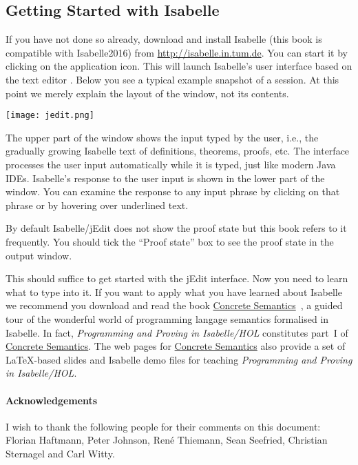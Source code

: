 \ifsem
\subsection*{Getting Started with Isabelle}

If you have not done so already, download and install Isabelle
(this book is compatible with Isabelle2016)
from \url{http://isabelle.in.tum.de}. You can start it by clicking
on the application icon. This will launch Isabelle's
user interface based on the text editor . Below you see
a typical example snapshot of a session. At this point we merely explain
the layout of the window, not its contents.

\begin{center}
\texttt{[image: jedit.png]}
\end{center}
The upper part of the window shows the input typed by the user, i.e., the
gradually growing Isabelle text of definitions, theorems, proofs, etc.  The
interface processes the user input automatically while it is typed, just like
modern Java IDEs.  Isabelle's response to the user input is shown in the
lower part of the window. You can examine the response to any input phrase
by clicking on that phrase or by hovering over underlined text.

\begin{warn}\label{proof-state}
By default Isabelle/jEdit does not show the proof state but this book
refers to it frequently. You should tick the ``Proof state'' box
to see the proof state in the output window.
\end{warn}

This should suffice to get started with the jEdit interface.
Now you need to learn what to type into it.
\else
If you want to apply what you have learned about Isabelle we recommend you
download and read the book
\href{http://www.concrete-semantics.org}{Concrete
Semantics}~\cite{ConcreteSemantics}, a guided tour of the wonderful world of
programming langage semantics formalised in Isabelle.  In fact,
\emph{Programming and Proving in Isabelle/HOL} constitutes part~I of
\href{http://www.concrete-semantics.org}{Concrete Semantics}.  The web
pages for \href{http://www.concrete-semantics.org}{Concrete Semantics}
also provide a set of \LaTeX-based slides and Isabelle demo files
for teaching \emph{Programming and Proving in Isabelle/HOL}.
\fi

\ifsem\else
\paragraph{Acknowledgements}
I wish to thank the following people for their comments on this document:
Florian Haftmann, Peter Johnson, Ren\'{e} Thiemann, Sean Seefried,
Christian Sternagel and Carl Witty.
\fi